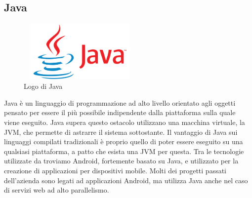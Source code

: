    \subsection{Java}
   \begin{figure}[H]
      \begin{center}
         \includegraphics[width=6cm,height=3cm,keepaspectratio]{immagini/java-logo}      
      \end{center}
      \caption{Logo di Java}\label{logojava}
   \end{figure}
   Java è un linguaggio di programmazione ad alto livello orientato agli oggetti pensato per essere il più possibile indipendente dalla piattaforma sulla quale viene eseguito. Java supera questo ostacolo utilizzano una macchina virtuale, la JVM, che permette di astrarre il sistema sottostante. Il vantaggio di Java sui linguaggi compilati tradizionali è proprio quello di poter essere eseguito su una qualsiasi piattaforma, a patto che esista una JVM per questa. Tra le tecnologie utilizzate da \nomeAzienda{} troviamo Android, fortemente basato su Java, e utilizzato per la creazione di applicazioni per dispositivi mobile. Molti dei progetti passati dell'azienda sono legati ad applicazioni Android, ma \nomeAzienda{} utilizza Java anche nel caso di servizi web ad alto parallelismo.

